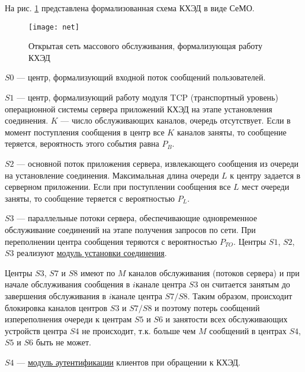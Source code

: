 \vspace{\baselineskip}
На рис. \ref{img:net} представлена формализованная схема КХЭД в виде СеМО.

\begin{figure}[h]
  \centering
  \texttt{[image: net]}
  \caption{Открытая сеть массового обслуживания, формализующая работу КХЭД}
  \label{img:net}
\end{figure}

$S0$ --- центр, формализующий входной поток сообщений пользователей.

\vspace{\baselineskip}
$S1$ --- центр, формализующий работу модуля TCP (транспортный уровень) операционной системы сервера приложений КХЭД на этапе установления соединения. $K$ --- число обслуживающих каналов, очередь отсутствует. Если в момент поступления сообщения в центр все $K$ каналов заняты, то сообщение теряется, вероятность этого события равна $P_B$.

\vspace{\baselineskip}
$S2$ --- основной поток приложения сервера, извлекающего сообщения из очереди на установление соединения. Максимальная длина очереди $L$ к центру задается в серверном приложении. Если при поступлении сообщения все $L$ мест очереди заняты, то сообщение теряется с вероятностью $P_L$.

\vspace{\baselineskip}
$S3$ --- параллельные потоки сервера, обеспечивающие одновременное обслуживание соединений на этапе получения запросов по сети. При переполнении центра сообщения теряются с вероятностью $P_{TO}$.
Центры $S1$, $S2$, $S3$ реализуют \underline{модуль установки соединения}.

\vspace{\baselineskip}
Центры $S3$, $S7$ и $S8$ имеют по $M$ каналов обслуживания (потоков сервера) и при начале обслуживания сообщения в $i$ канале центра $S3$ он считается занятым до завершения обслуживания в $i$ канале центра $S7/S8$. Таким образом, происходит блокировка каналов центров $S3$ и $S7/S8$ и поэтому потерь сообщений из переполнения очереди к центрам $S5$ и $S6$ и занятости всех обслуживающих устройств центра $S4$ не происходит, т.к. больше чем $M$ сообщений в центрах $S4$, $S5$ и $S6$ быть не может.

\vspace{\baselineskip}
$S4$ --- \underline{модуль аутентификации} клиентов при обращении к КХЭД.

